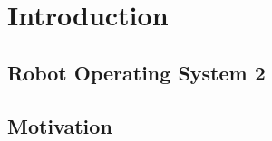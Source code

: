 \chapter{Introduction}\label{cha:introduction}

\section{Robot Operating System 2}

\section{Motivation}
